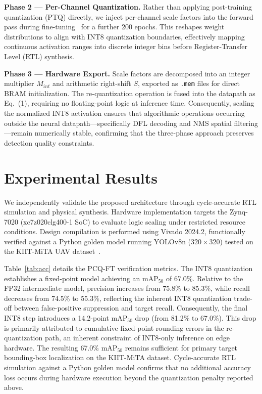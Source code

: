 \documentclass{svproc}
\begin{document}
\textbf{Phase 2 --- Per-Channel Quantization.}
Rather than applying post-training quantization (PTQ) directly, we inject per-channel scale factors into the forward pass during fine-tuning~\cite{jacob2018quantization} for a further 200 epochs. This reshapes weight distributions to align with INT8 quantization boundaries, effectively mapping continuous activation ranges into discrete integer bins before Register-Transfer Level (RTL) synthesis.

\textbf{Phase 3 --- Hardware Export.}
Scale factors are decomposed into an integer multiplier $M_{int}$ and arithmetic right-shift $S$, exported as \texttt{.mem} files for direct BRAM initialization. The re-quantization operation is fused into the datapath as Eq.~(1), requiring no floating-point logic at inference time. Consequently, scaling the normalized INT8 activation ensures that algorithmic operations occurring outside the neural datapath---specifically DFL decoding and NMS spatial filtering---remain numerically stable, confirming that the three-phase approach preserves detection quality constraints.

\section{Experimental Results}
\label{sec:results}

We independently validate the proposed architecture through cycle-accurate RTL simulation and physical synthesis. Hardware implementation targets the Zynq-7020 (xc7z020clg400-1 SoC) to evaluate logic scaling under restricted resource conditions. Design compilation is performed using Vivado 2024.2, functionally verified against a Python golden model running YOLOv8n ($320{\times}320$) tested on the KIIT-MiTA UAV dataset~\cite{chakrabarty2025kiitmita}.

Table~\ref{tab:acc} details the PCQ-FT verification metrics. The INT8 quantization establishes a fixed-point model achieving an $\text{mAP}_{50}$ of 67.0\%. Relative to the FP32 intermediate model, precision increases from 75.8\% to 85.3\%, while recall decreases from 74.5\% to 55.3\%, reflecting the inherent INT8 quantization trade-off between false-positive suppression and target recall. Consequently, the final INT8 step introduces a 14.2-point $\text{mAP}_{50}$ drop (from 81.2\% to 67.0\%). This drop is primarily attributed to cumulative fixed-point rounding errors in the re-quantization path, an inherent constraint of INT8-only inference on edge hardware. The resulting 67.0\% $\text{mAP}_{50}$ remains sufficient for primary target bounding-box localization on the KIIT-MiTA dataset. Cycle-accurate RTL simulation against a Python golden model confirms that no additional accuracy loss occurs during hardware execution beyond the quantization penalty reported above.
\end{document}
